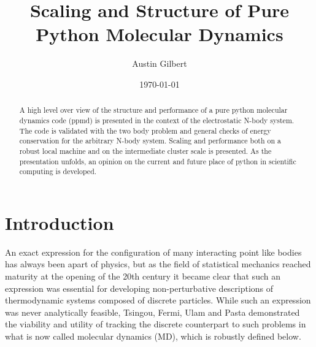 \documentclass[%
 reprint,
 amsmath,amssymb,
 aps,
pra,
prb,
rmp,
prstab,
prstper,
]{revtex4-1}
\begin{document}

\title{Scaling and Structure of Pure Python Molecular Dynamics}%

\author{Austin Gilbert}

\date{\today}%

\begin{abstract}
A high level over view of the structure and performance of a pure python 
molecular dynamics code (ppmd) is presented in the context of the electrostatic
N-body system. The code is validated with the two body problem and general checks of energy conservation for the arbitrary N-body system. Scaling and performance both on a robust local machine and on the intermediate cluster
scale is presented. As the presentation unfolds, an opinion on the current and
future place of python in scientific computing is developed.
\end{abstract}


\maketitle


\section{\label{sec:level1}Introduction}
An exact expression for the configuration of many interacting point like bodies
has always been apart of physics, but as the field of statistical mechanics
reached maturity at the opening of the 20th century it became clear that
such an expression was essential for developing non-perturbative descriptions of 
thermodynamic systems composed of discrete particles. While such an expression
was never analytically feasible, Tsingou, Fermi, Ulam and Pasta demonstrated
\cite{dauxois_2008}
the viability and utility of tracking the discrete counterpart to such
problems in what is now called molecular dynamics (MD), which is robustly 
defined below.
\end{document}

